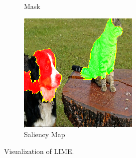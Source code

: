 \begin{figure}[ht]
\begin{subfigure}{0.32\linewidth}
    \caption{Mask}
    \label{fig:bird-a}
  \end{subfigure}
  \begin{subfigure}{0.32\linewidth}
    \includegraphics[width=\linewidth]{figures/lime_cat_map.png}
    \caption{Saliency Map}
    \label{fig:bird-a}
  \end{subfigure}
  \caption{Visualization of LIME.}\label{fig:lime_cat}
  \vspace{-0.3cm}
\end{figure}



